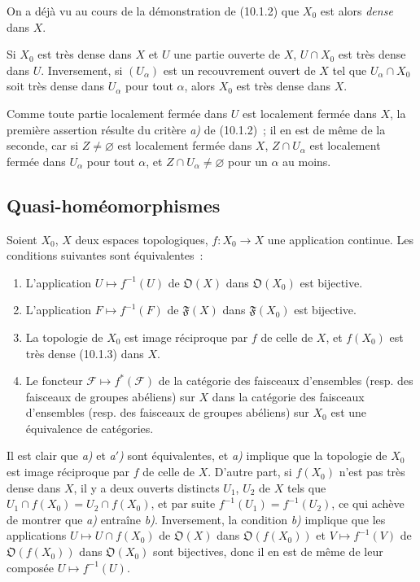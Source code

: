 On a déjà vu au cours de la démonstration de (10.1.2) que $X_0$ est alors
\emph{dense} dans $X$.

\begin{corollary}[10.1.4]
\label{IV.10.1.4-fr}
Si $X_0$ est très dense dans $X$ et $U$ une partie ouverte de $X$,
$U\cap X_0$ est très dense dans $U$. Inversement, si $(U_\alpha)$ est un
recouvrement ouvert de $X$ tel que $U_\alpha\cap X_0$ soit très dense dans
$U_\alpha$ pour tout $\alpha$, alors $X_0$ est très dense dans $X$.
\end{corollary}

Comme toute partie localement fermée dans $U$ est localement fermée dans $X$,
la première assertion résulte du critère \emph{a)} de (10.1.2)~; il en est de
même de la seconde, car si $Z\neq\varnothing$ est localement fermée dans $X$,
$Z\cap U_\alpha$ est localement fermée dans $U_\alpha$ pour tout $\alpha$,
et $Z\cap U_\alpha\neq\varnothing$ pour un $\alpha$ au moins.

\subsection{Quasi-homéomorphismes}
\label{subsection:IV.10.2-fr}

\begin{proposition}[10.2.1]
Soient $X_0$, $X$ deux espaces topologiques, $f:X_0\to X$ une application
continue. Les conditions suivantes sont équivalentes~:
\begin{enumerate}[label=\emph{\alph*)}]
  \item L'application $U\mapsto f^{-1}(U)$ de $\mathfrak O(X)$ dans
  $\mathfrak O(X_0)$ est bijective.
  \item[\emph{a$'$)}] L'application $F\mapsto f^{-1}(F)$ de $\mathfrak F(X)$
  dans $\mathfrak F(X_0)$ est bijective.
  \item La topologie de $X_0$ est image réciproque par $f$ de celle de $X$, et
  $f(X_0)$ est très dense (10.1.3) dans $X$.
  \item Le foncteur $\mathcal F\mapsto f^*(\mathcal F)$ de la catégorie des
  faisceaux d'ensembles (resp. des faisceaux de groupes abéliens) sur $X$ dans
  la catégorie des faisceaux d'ensembles (resp. des faisceaux de groupes
  abéliens) sur $X_0$ est une équivalence de catégories.
\end{enumerate}
\end{proposition}

Il est clair que \emph{a)} et \emph{a$'$)} sont équivalentes, et \emph{a)}
implique que la topologie de $X_0$ est image réciproque par $f$ de celle de
$X$. D'autre part, si $f(X_0)$ n'est pas très dense dans $X$, il y a deux
ouverts distincts $U_1$, $U_2$ de $X$ tels que
$U_1\cap f(X_0)=U_2\cap f(X_0)$, et par suite
$f^{-1}(U_1)=f^{-1}(U_2)$, ce qui achève de montrer que \emph{a)} entraîne
\emph{b)}. Inversement, la condition \emph{b)} implique que les applications
$U\mapsto U\cap f(X_0)$ de $\mathfrak O(X)$ dans $\mathfrak O(f(X_0))$ et
$V\mapsto f^{-1}(V)$ de $\mathfrak O(f(X_0))$ dans $\mathfrak O(X_0)$ sont
bijectives, donc il en est de même de leur composée $U\mapsto f^{-1}(U)$.

